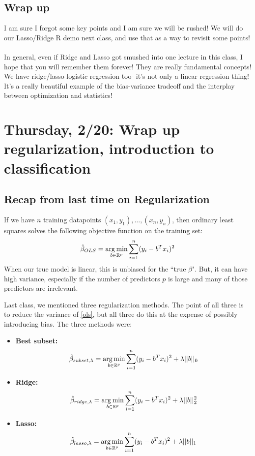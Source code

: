 \subsection{Wrap up}

I am sure I forgot some key points and I am sure we will be rushed! We will do our Lasso/Ridge R demo next class, and use that as a way to revisit some points! \\
\\
In general, even if Ridge and Lasso got smushed into one lecture in this class, I hope that you will remember them forever! They are really fundamental concepts! We have ridge/lasso logistic regression too- it's not only a linear regression thing! It's a really beautiful example of the bias-variance tradeoff and the interplay between optimization and statistics!

\section{Thursday, 2/20: Wrap up regularization, introduction to classification}

\subsection{Recap from last time on Regularization}

If we have $n$ training datapoints $(x_1, y_1), \ldots, (x_n, y_n)$, then ordinary least squares solves the following objective function on the training set:
\begin{equation}
\label{ols}
\hat{\beta}_{OLS} = \mathop{\mathrm{arg\,min}}_{b \in \mathbb{R}^p} \sum_{i=1}^n 	(y_i - b^T x_i)^2
\end{equation}
When our true model is linear, this is unbiased for the ``true $\beta$". But, it can have high variance, especially if the number of predictors $p$ is large and many of those predictors are irrelevant. 

Last class, we mentioned three regularization methods. The point of all three is to reduce the variance of \eqref{ols}, but all three do this at the expense of possibly introducing bias. The three methods were:

\begin{itemize}
\item \textbf{Best subset:} 
\begin{equation}
\label{subset}
\hat{\beta}_{subset,\lambda} = \mathop{\mathrm{arg\,min}}_{b \in \mathbb{R}^p} \sum_{i=1}^n 	(y_i - b^T x_i)^2 + \lambda ||b||_0
\end{equation}
\item \textbf{Ridge: }
\begin{equation}
\label{ridge}
\hat{\beta}_{ridge,\lambda} = \mathop{\mathrm{arg\,min}}_{b \in \mathbb{R}^p} \sum_{i=1}^n 	(y_i - b^T x_i)^2 + \lambda ||b||_2^2
\end{equation}
\item \textbf{Lasso: }	
\begin{equation}
\label{lasso}
\hat{\beta}_{lasso,\lambda} = \mathop{\mathrm{arg\,min}}_{b \in \mathbb{R}^p} \sum_{i=1}^n 	(y_i - b^T x_i)^2 + \lambda ||b||_1
\end{equation}
\end{itemize}


